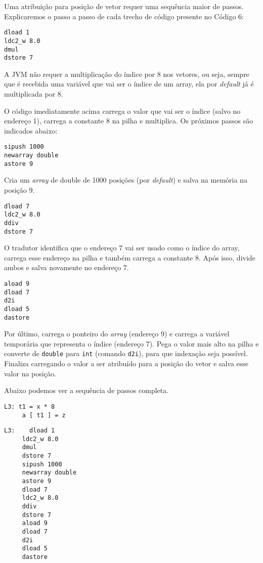 Uma atribuição para posição de vetor requer uma sequência maior de passos. Explicaremos o passo a passo de cada trecho de código presente no Código 6:

\begin{lstlisting}
dload 1
ldc2_w 8.0
dmul
dstore 7
\end{lstlisting}

A JVM não requer a multiplicação do índice por 8 nos vetores, ou seja, sempre que é recebida uma variável que vai ser o índice de um array, ela por \textit{default} já é multiplicada por 8.

O código imediatamente acima carrega o valor que vai ser o índice (salvo no endereço 1), carrega a constante 8 na pilha e multiplica. Os próximos passos são indicados abaixo:

\begin{lstlisting}
sipush 1000
newarray double
astore 9
\end{lstlisting}

Cria um \textit{array} de double de 1000 posições (por \textit{default}) e salva na memória na posição 9.

\begin{lstlisting}
dload 7
ldc2_w 8.0
ddiv
dstore 7
\end{lstlisting}

O tradutor identifica que o endereço 7 vai ser usado como o índice do array, carrega esse endereço na pilha e também carrega a constante 8. Após isso, divide ambos e salva novamente no endereço 7.

\begin{lstlisting}
aload 9
dload 7
d2i
dload 5
dastore
\end{lstlisting}

Por último, carrega o ponteiro do \textit{array} (endereço 9) e  carrega a variável temporária que representa o índice (endereço 7). Pega o valor mais alto na pilha e converte de \texttt{double} para \texttt{int} (comando \texttt{d2i}), para que indexação seja possível. Finaliza carregando o valor a ser atribuído para a posição do vetor e salva esse valor na posição. 

Abaixo podemos ver a sequência de passos completa.


\begin{lstlisting}[caption=Atribuição para posição de vetor em código intermediário.]
L3:	t1 = x * 8
     a [ t1 ] = z
\end{lstlisting}

\begin{lstlisting}[caption=Atribuição para posição de vetor em Jasmin.]
L3:    dload 1
     ldc2_w 8.0
     dmul
     dstore 7
     sipush 1000
     newarray double
     astore 9
     dload 7
     ldc2_w 8.0
     ddiv
     dstore 7
     aload 9
     dload 7
     d2i
     dload 5
     dastore
\end{lstlisting}


